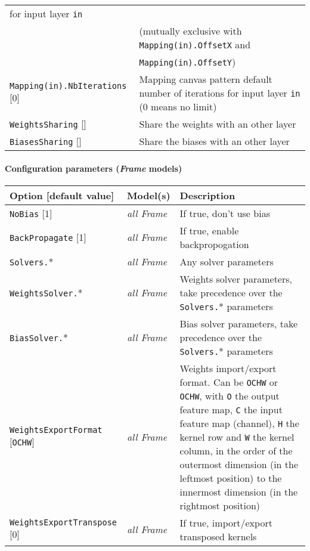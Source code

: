 \documentclass[a4paper,11pt,oneside]{article}
\begin{document}
\begin{center}
\begin{longtable}{| p{5cm} | p{10cm} | }
  for input layer \lstinline!in! \\
   & (mutually exclusive with \lstinline!Mapping(in).OffsetX! and \\
   & \lstinline!Mapping(in).OffsetY!) \\
  \lstinline!Mapping(in).NbIterations! [0] & Mapping canvas pattern default
   number of iterations for input layer \lstinline!in! (0 means no limit) \\
  \lstinline!WeightsSharing! [] & Share the weights with an other layer \\
  \lstinline!BiasesSharing! [] & Share the biases with an other layer \\
 \hline
\end{longtable}
\end{center}

\paragraph{Configuration parameters (\emph{Frame} models)}

\begin{center}
 \begin{longtable}{| p{4cm} | p{3cm} | p{9cm} | }
 \hline
 Option [default value] & Model(s) & Description\\
 \hline\hline
  \lstinline!NoBias! [1] & \emph{all Frame} & If true, don't use bias \\
  \lstinline!BackPropagate! [1] & \emph{all Frame} & If true, enable
  backpropogation \\
  \lstinline!Solvers.!* & \emph{all Frame} & Any solver parameters \\
  \lstinline!WeightsSolver.!* & \emph{all Frame} & Weights solver parameters,
  take precedence over the \lstinline!Solvers.!* parameters \\
  \lstinline!BiasSolver.!* & \emph{all Frame} & Bias solver parameters,
  take precedence over the \lstinline!Solvers.!* parameters \\
  \lstinline!WeightsExportFormat! [\lstinline!OCHW!] & \emph{all Frame} &
  Weights import/export format. Can be \lstinline!OCHW! or \lstinline!OCHW!,
  with \lstinline!O! the output feature map, \lstinline!C! the input feature map
   (channel), \lstinline!H! the kernel row and \lstinline!W! the kernel column,
   in the order of the outermost dimension (in the leftmost position) to the
   innermost dimension (in the rightmost position) \\
  \lstinline!WeightsExportTranspose! [0] & \emph{all Frame} & If true,
  import/export transposed kernels \\
 \hline
\end{longtable}
\end{center}
\end{document}
